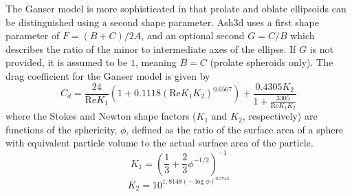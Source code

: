 The Ganser model is more sophisticated in that prolate and oblate ellipsoids
can be distinguished using a second shape parameter.  Ash3d uses a first
shape parameter of $F=(B+C)/2A$, and an optional second $G=C/B$ which describes
the ratio of the minor to intermediate axes of the ellipse.  If $G$ is not
provided, it is assumed to be $1$, meaning $B=C$ (prolate spheroids only).
The drag coefficient for the Ganser model is given by
\begin{equation}\label{EqFVGansCd}
C_d = \frac{24}{\mathrm{Re}K_1} \left( 1 + 0.1118 \left(\mathrm{Re} K_1 K_2 \right)^{0.6567}\right)
+ \frac{0.4305 K_2}{1+ \frac{3305}{\mathrm{Re} K_1 K_2}}
\end{equation}
where the Stokes and Newton shape factors ($K_1$ and $K_2$, respectively)
are functions of the sphericity, $\phi$, defined as
the ratio of the surface area of a sphere with equivalent particle volume to
the actual surface area of the particle.  
\begin{equation}\label{EqFVGansK1}
K_1 = \left( \frac{1}{3} +\frac{2}{3}\phi^{-1/2}  \right)^{-1}
\end{equation}
\begin{equation}\label{EqFVGansK2}
K_2 = 10^{1,8148 \left( -\log \phi \right)^{0.5743}}
\end{equation}

